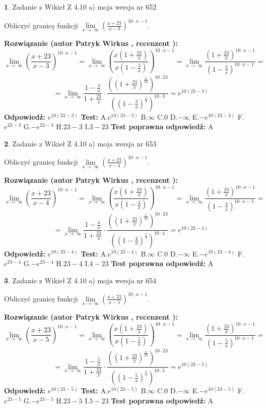 \documentclass[12pt, a4paper]{article}
\theoremstyle{definition} %
\newtheorem{zad}{}
\newcommand{\zadStart}[1]{\begin{zad}#1\newline}
\newcommand{\zadStop}{\end{zad}}
\newcommand{\rozwStart}[2]{\noindent \textbf{Rozwiązanie (autor #1 , recenzent #2): }\newline}
\newcommand{\rozwStop}{\newline}
\newcommand{\odpStart}{\noindent \textbf{Odpowiedź:}\newline}
\newcommand{\odpStop}{\newline}
\newcommand{\testStart}{\noindent \textbf{Test:}\newline}
\newcommand{\testStop}{\newline}
\newcommand{\kluczStart}{\noindent \textbf{Test poprawna odpowiedź:}\newline}
\newcommand{\kluczStop}{\newline}
\begin{document}
\zadStart{Zadanie z Wikieł Z 4.10 a) moja wersja nr 652}


Obliczyć granicę funkcji  $\lim\limits_{x\to\ \infty}(\frac{x+23}{x-3})^{10\cdot x-1}$.
\zadStop
\rozwStart{Patryk Wirkus}{}
$$\lim\limits_{x\to\ \infty}(\frac{x+23}{x-3})^{10\cdot x-1} = \lim\limits_{x\to\ \infty}(\frac{x(1+\frac{23}{x})}{x(1-\frac{3}{x})})^{10\cdot x-1}=\lim\limits_{x\to\ \infty}\frac{(1+\frac{23}{x})^{10\cdot x-1}}{(1-\frac{3}{x})^{10\cdot x-1}}=$$
$$=\lim\limits_{x\to\ \infty}\frac{1-\frac{3}{x}}{1+\frac{23}{x}}\cdot\frac{((1+\frac{23}{x})^{\frac{x}{23}})^{10\cdot23}}{((1-\frac{3}{x})^{\frac{x}{3}})^{10\cdot3}}=e^{10(23-3)}$$
\rozwStop
\odpStart
$e^{10(23-3)}$
\odpStop
\testStart
A.$e^{10(23-3)}$ B.$\infty$ C.$0$ D.$-\infty$ E.$-e^{10(23-3)}$
F.$e^{23-3}$ G.$-e^{23-3}$
H.$23-3$
I.$3-23$
\testStop
\kluczStart
A
\kluczStop



\zadStart{Zadanie z Wikieł Z 4.10 a) moja wersja nr 653}


Obliczyć granicę funkcji  $\lim\limits_{x\to\ \infty}(\frac{x+23}{x-4})^{10\cdot x-1}$.
\zadStop
\rozwStart{Patryk Wirkus}{}
$$\lim\limits_{x\to\ \infty}(\frac{x+23}{x-4})^{10\cdot x-1} = \lim\limits_{x\to\ \infty}(\frac{x(1+\frac{23}{x})}{x(1-\frac{4}{x})})^{10\cdot x-1}=\lim\limits_{x\to\ \infty}\frac{(1+\frac{23}{x})^{10\cdot x-1}}{(1-\frac{4}{x})^{10\cdot x-1}}=$$
$$=\lim\limits_{x\to\ \infty}\frac{1-\frac{4}{x}}{1+\frac{23}{x}}\cdot\frac{((1+\frac{23}{x})^{\frac{x}{23}})^{10\cdot23}}{((1-\frac{4}{x})^{\frac{x}{4}})^{10\cdot4}}=e^{10(23-4)}$$
\rozwStop
\odpStart
$e^{10(23-4)}$
\odpStop
\testStart
A.$e^{10(23-4)}$ B.$\infty$ C.$0$ D.$-\infty$ E.$-e^{10(23-4)}$
F.$e^{23-4}$ G.$-e^{23-4}$
H.$23-4$
I.$4-23$
\testStop
\kluczStart
A
\kluczStop



\zadStart{Zadanie z Wikieł Z 4.10 a) moja wersja nr 654}


Obliczyć granicę funkcji  $\lim\limits_{x\to\ \infty}(\frac{x+23}{x-5})^{10\cdot x-1}$.
\zadStop
\rozwStart{Patryk Wirkus}{}
$$\lim\limits_{x\to\ \infty}(\frac{x+23}{x-5})^{10\cdot x-1} = \lim\limits_{x\to\ \infty}(\frac{x(1+\frac{23}{x})}{x(1-\frac{5}{x})})^{10\cdot x-1}=\lim\limits_{x\to\ \infty}\frac{(1+\frac{23}{x})^{10\cdot x-1}}{(1-\frac{5}{x})^{10\cdot x-1}}=$$
$$=\lim\limits_{x\to\ \infty}\frac{1-\frac{5}{x}}{1+\frac{23}{x}}\cdot\frac{((1+\frac{23}{x})^{\frac{x}{23}})^{10\cdot23}}{((1-\frac{5}{x})^{\frac{x}{5}})^{10\cdot5}}=e^{10(23-5)}$$
\rozwStop
\odpStart
$e^{10(23-5)}$
\odpStop
\testStart
A.$e^{10(23-5)}$ B.$\infty$ C.$0$ D.$-\infty$ E.$-e^{10(23-5)}$
F.$e^{23-5}$ G.$-e^{23-5}$
H.$23-5$
I.$5-23$
\testStop
\kluczStart
A
\kluczStop
\end{document}

